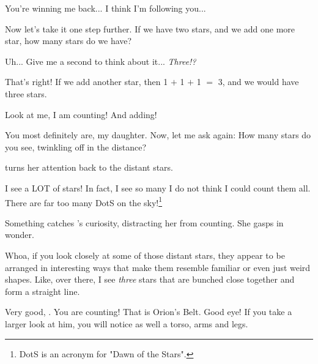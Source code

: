 \documentclass[main.tex]{subfiles}
\begin{document}
\par \Maia You're winning me back...  I think I'm following you...

\par \Pleione Now let's take it one step further.  If we have two stars, and we add one more star, how many stars do we have?

 
\par \Maia Uh... Give me a second to think about it... \textit{Three!?}

\par \Pleione That's right!  If we add another star, then 1 $+$ 1 $+$ 1 $=$ 3, and we would have three stars.  

\par \Maia Look at me, I am counting!  And adding!

\par \Pleione You most definitely are, my daughter.  Now, let me ask again:  How many stars do you see, twinkling off in the distance?

\par \nar \rmmaia turns her attention back to the distant stars.  

\par \Maia I see a LOT of stars!  In fact, I see so many I do not think I could count them all.  There are far too many DotS on the sky!\footnote{DotS is an acronym for "Dawn of the Stars".}

\par \nar Something catches \rmmaia's curiosity, distracting her from counting.  She gasps in wonder.

\par \Maia Whoa, if you look closely at some of those distant stars, they appear to be arranged in interesting ways that make them resemble familiar or even just weird shapes.  Like, over there, I see \textit{three} stars that are bunched close together and form a straight line.

\par \Pleione Very good, \rmmaia.  You are counting!  That is Orion's Belt.  Good eye!  If you take a larger look at him, you will notice as well a torso, arms and legs.  
\end{document}

